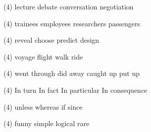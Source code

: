 \begin{tasks}(4)
	\task lecture
	\task debate
	\task conversation
	\task negotiation
\end{tasks}
\item
\begin{tasks}(4)
	\task trainees
	\task employees
	\task researchers
	\task passengers
\end{tasks}
\item
\begin{tasks}(4)
	\task reveal
	\task choose
	\task predict
	\task design
\end{tasks}
\item
\begin{tasks}(4)
	\task voyage
	\task flight
	\task walk
	\task ride
\end{tasks}
\item
\begin{tasks}(4)
	\task went through
	\task did away
	\task caught up
	\task put up
\end{tasks}
\item
\begin{tasks}(4)
	\task In turn
	\task In fact
	\task In particular
	\task In consequence
\end{tasks}
\item
\begin{tasks}(4)
	\task unless
	\task whereas
	\task if
	\task since
\end{tasks}
\item
\begin{tasks}(4)
	\task funny
	\task simple
	\task logical
	\task rare
\end{tasks}